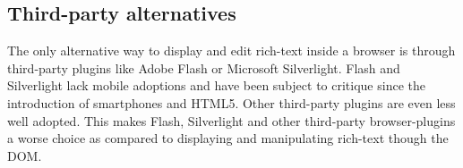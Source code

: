 

\subsection{Third-party alternatives}

The only alternative way to display and edit rich-text inside a browser is through third-party plugins like Adobe Flash or Microsoft Silverlight. Flash and Silverlight lack mobile adoptions and have been subject to critique since the introduction of smartphones and HTML5. Other third-party plugins are even less well adopted. This makes Flash, Silverlight and other third-party browser-plugins a worse choice as compared to displaying and manipulating rich-text though the DOM.